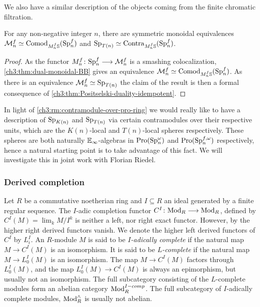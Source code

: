 We also have a similar description of the objects coming from the finite chromatic filtration. 

\begin{proposition}
    For any non-negative integer $n$, there are symmetric monoidal equivalences $\mathcal{M}_{n}^f \simeq \mathrm{Comod}_{M^f_n\mathbb{S}}(\mathrm{Sp}^f_n)$ and $\mathrm{Sp}_{T(n)}\simeq \mathrm{Contra}_{M^f_n\mathbb{S}}(\mathrm{Sp}^f_n)$.
\end{proposition}
\begin{proof}
    As the functor $M_n^f\colon \mathrm{Sp}_n^f \longrightarrow \mathcal{M}_n^f$ is a smashing colocalization, \cref{ch3:thm:dual-monoidal-BB} gives an equivalence $\mathcal{M}_n^f \simeq \mathrm{Comod}_{M_n^f \mathbb{S}}(\mathrm{Sp}_n^f)$. As there is an equivalence $\mathcal{M}_n^f \simeq \mathrm{Sp}_{T(n)}$ the claim of the result is then a formal consequence of \cref{ch3:thm:Positselski-duality-idempotent}.
\end{proof}

\begin{remark}
    In light of \cref{ch3:rm:contramodule-over-pro-ring} we would really like to have a description of $\mathrm{Sp}_{K(n)}$ and $\mathrm{Sp}_{T(n)}$ via certain contramodules over their respective units, which are the $K(n)$-local and $T(n)$-local spheres respectively. These spheres are both naturally $\mathbb{E}_\infty$-algebras in $\operatorname{Pro}(\mathrm{Sp}_n^\omega)$ and $\operatorname{Pro}(\mathrm{Sp}_n^{f, \omega})$ respectively, hence a natural starting point is to take advantage of this fact. We will investigate this in joint work with Florian Riedel. 
\end{remark}

\subsubsection*{Derived completion}

Let $R$ be a commutative noetherian ring and $I\subseteq R$ an ideal generated by a finite regular sequence. The $I$-adic completion functor $C^I\colon \mathrm{Mod}_R \longrightarrow \mathrm{Mod}_R$, defined by $C^I(M)=\lim_k M/I^k$ is neither a left, nor right exact functor. However, by \cite[5.1]{greenlees-may_92} the higher right derived functors vanish. We denote the higher left derived functors of $C^I$ by $L^I_i$. An $R$-module $M$ is said to be \emph{$I$-adically complete} if the natural map $M\to C^I (M)$ is an isomorphism. It is said to be \emph{$L$-complete} if the natural map $M\to L_0^I(M)$ is an isomorphism. The map $M\to C^I(M)$ factors through $L_0^I(M)$, and the map $L_0^I(M)\to C^I(M)$ is always an epimorphism, but usually not an isomorphism. The full subcategory consisting of the $L$-complete modules form an abelian category $\mathrm{Mod}_R^{I-comp}$. The full subcategory of $I$-adically complete modules, $\mathrm{Mod}_R^\wedge$ is usually not abelian. 

